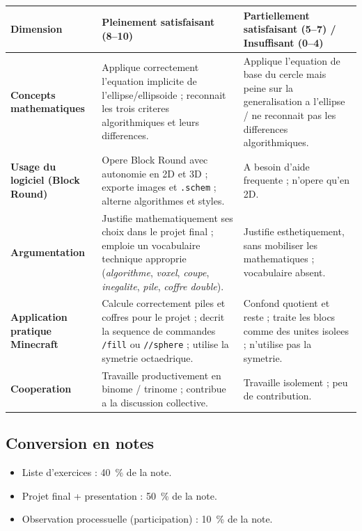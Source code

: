 \documentclass[12pt,a4paper]{scrartcl}
\newcommand{\cmd}[1]{\textcolor{earth}{\texttt{\small #1}}}
\begin{document}
\begin{center}
\small
\begin{tabularx}{\textwidth}{@{}p{}XX@{}}
\toprule
\textbf{Dimension} & \textbf{Pleinement satisfaisant (8--10)} & \textbf{Partiellement satisfaisant (5--7) / Insuffisant (0--4)} \\
\midrule
\textbf{Concepts mathematiques} & Applique correctement l'equation implicite de l'ellipse/ellipsoide ; reconnait les trois criteres algorithmiques et leurs differences. & Applique l'equation de base du cercle mais peine sur la generalisation a l'ellipse / ne reconnait pas les differences algorithmiques. \\
\addlinespace[3pt]
\textbf{Usage du logiciel (Block Round)} & Opere Block Round avec autonomie en 2D et 3D ; exporte images et \texttt{.schem} ; alterne algorithmes et styles. & A besoin d'aide frequente ; n'opere qu'en 2D. \\
\addlinespace[3pt]
\textbf{Argumentation} & Justifie mathematiquement ses choix dans le projet final ; emploie un vocabulaire technique approprie (\emph{algorithme}, \emph{voxel}, \emph{coupe}, \emph{inegalite}, \emph{pile}, \emph{coffre double}). & Justifie esthetiquement, sans mobiliser les mathematiques ; vocabulaire absent. \\
\addlinespace[3pt]
\textbf{Application pratique Minecraft} & Calcule correctement piles et coffres pour le projet ; decrit la sequence de commandes \cmd{/fill} ou \cmd{//sphere} ; utilise la symetrie octaedrique. & Confond quotient et reste ; traite les blocs comme des unites isolees ; n'utilise pas la symetrie. \\
\addlinespace[3pt]
\textbf{Cooperation} & Travaille productivement en binome / trinome ; contribue a la discussion collective. & Travaille isolement ; peu de contribution. \\
\bottomrule
\end{tabularx}
\end{center}

\subsection{Conversion en notes}
\begin{itemize}[leftmargin=1.3em,itemsep=0.1em,topsep=0.2em,nosep]
  \item Liste d'exercices : 40~\% de la note.
  \item Projet final + presentation : 50~\% de la note.
  \item Observation processuelle (participation) : 10~\% de la note.
\end{itemize}
\end{document}
